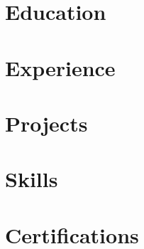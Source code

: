 \documentclass[10pt,letterpaper,sans]{moderncv}
\begin{document}
\makecvtitle

\section{Education}      \cvEducation
\section{Experience}     \cvExperience
\section{Projects}       \cvProjects
\section{Skills}         \cvSkills
\section{Certifications} \cvCerts
\end{document}
